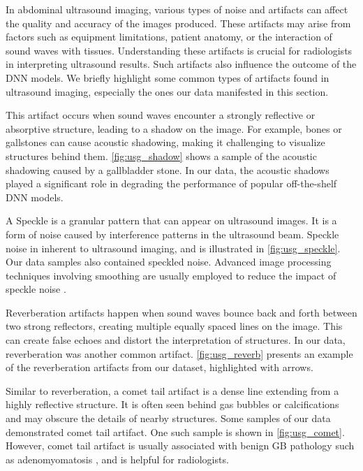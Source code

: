 %
In abdominal ultrasound imaging, various types of noise and artifacts can affect the quality and accuracy of the images produced. These artifacts may arise from factors such as equipment limitations, patient anatomy, or the interaction of sound waves with tissues. Understanding these artifacts is crucial for radiologists in interpreting ultrasound results. Such artifacts also influence the outcome of the DNN models. We briefly highlight some common types of artifacts found in ultrasound imaging, especially the ones our data manifested in this section. 

 This artifact occurs when sound waves encounter a strongly reflective or absorptive structure, leading to a shadow on the image. For example, bones or gallstones can cause acoustic shadowing, making it challenging to visualize structures behind them. \cref{fig:usg_shadow} shows a sample of the acoustic shadowing caused by a gallbladder stone. In our data, the acoustic shadows played a significant role in degrading the performance of popular off-the-shelf DNN models.
    
 A Speckle is a granular pattern that can appear on ultrasound images. It is a form of noise caused by interference patterns in the ultrasound beam. Speckle noise in inherent to ultrasound imaging, and is illustrated in \cref{fig:usg_speckle}. Our data samples also contained speckled noise. Advanced image processing techniques involving smoothing are usually employed to reduce the impact of speckle noise \cite{despeckle}. 
    
 Reverberation artifacts happen when sound waves bounce back and forth between two strong reflectors, creating multiple equally spaced lines on the image. This can create false echoes and distort the interpretation of structures. In our data, reverberation was another common artifact. \cref{fig:usg_reverb} presents an example of the reverberation artifacts from our dataset, highlighted with arrows. 
    
 Similar to reverberation, a comet tail artifact is a dense line extending from a highly reflective structure. It is often seen behind gas bubbles or calcifications and may obscure the details of nearby structures. Some samples of our data demonstrated comet tail artifact. One such sample is shown in \cref{fig:usg_comet}. However, comet tail artifact is usually associated with benign GB pathology such as adenomyomatosis \cite{oh2019comet}, and is helpful for radiologists. 
    
